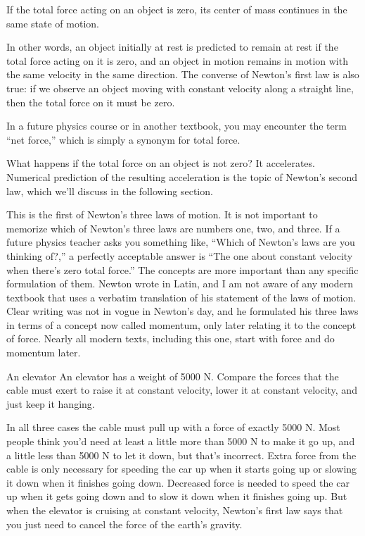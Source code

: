 \begin{important}\label{first-law}
If the total force acting on an object is zero, its center of mass
continues in the same state of motion.
\end{important}

In other words,  an object initially at rest is predicted to
remain at rest if the total force acting on it is zero, and an
object in motion remains in motion with the same velocity in
the same direction. The converse of Newton's first law is
also true: if we observe an object moving with constant
velocity along a straight line, then the total force on it must be zero.

In a future physics course or in another textbook, you may
encounter the term ``net force,'' which is
simply a synonym for total force.

What happens if the total force on an object is not zero? It
accelerates. Numerical prediction of the resulting
acceleration is the topic of Newton's second law, which
we'll discuss in the following section.

This is the first of Newton's three laws of motion. It is
not important to memorize which of Newton's three laws are
numbers one, two, and three. If a future  physics teacher
asks you something like, ``Which of Newton's laws are you
thinking of?,'' a perfectly acceptable answer is ``The one
about constant velocity when there's zero total force.'' The
concepts are more important than any specific formulation of
them. Newton wrote in Latin, and I am not aware of any
modern textbook that uses a verbatim translation of his
statement of the laws of motion. Clear writing was not in
vogue in Newton's day, and he formulated his three laws in
terms of a concept now called momentum, only later relating
it to the concept of force. Nearly all modern texts,
including this one, start with force and do momentum later.

\begin{eg}{An elevator}
\egquestion An elevator has a weight of 5000 N. Compare the
forces that the cable must exert to raise it at constant
velocity, lower it at constant velocity, and just keep it hanging.

\eganswer In all three cases the cable must pull up with a
force of exactly 5000 N. Most people think you'd need at
least a little more than 5000 N to make it go up, and a
little less than 5000 N to let it down, but that's
incorrect. Extra force from the cable is only necessary for
speeding the car up when it starts going up or slowing it
down when it finishes going down. Decreased force is needed
to speed the car up when it gets going down and to slow it
down when it finishes going up. But when the elevator is
cruising at constant velocity, Newton's first law says that
you just need to cancel the force of the earth's gravity.
\end{eg}

